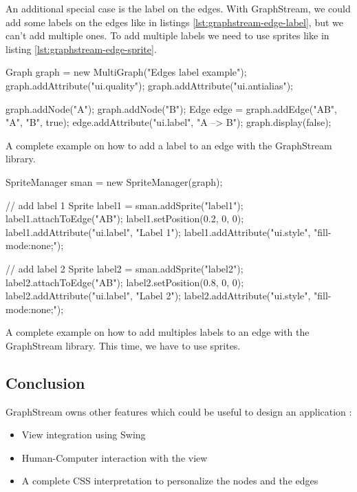 An additional special case is the label on the edges. With GraphStream, we could
add some labels on the edges like in listings \ref{lst:graphstream-edge-label},
but we can't add multiple ones. To add multiple labels we need to use sprites like
in listing \ref{lst:graphstream-edge-sprite}.

\begin{listing}[H]
  \centering
  \begin{javacode}
  Graph graph = new MultiGraph("Edges label example");
  graph.addAttribute("ui.quality");
  graph.addAttribute("ui.antialias");
  
  graph.addNode("A");
  graph.addNode("B");
  Edge edge = graph.addEdge("AB", "A", "B", true);
  edge.addAttribute("ui.label", "A --> B");
  graph.display(false);
  \end{javacode}
  \caption[Adding a label on an edge with GraphStream]{A complete example on how to
add a label to an edge with the GraphStream library.}
  \label{lst:graphstream-edge-label}
\end{listing}

\begin{listing}[H]
  \centering
  \begin{javacode}
    SpriteManager sman = new SpriteManager(graph);

    // add label 1
    Sprite label1 = sman.addSprite("label1");
    label1.attachToEdge("AB");
    label1.setPosition(0.2, 0, 0);
    label1.addAttribute("ui.label", "Label 1");
    label1.addAttribute("ui.style", "fill-mode:none;");

    // add label 2
    Sprite label2 = sman.addSprite("label2");
    label2.attachToEdge("AB");
    label2.setPosition(0.8, 0, 0);
    label2.addAttribute("ui.label", "Label 2");
    label2.addAttribute("ui.style", "fill-mode:none;");
  \end{javacode}
  \caption[Adding two labels on an edge with GraphStream]{A complete example on how
to add multiples labels to an edge with the GraphStream library. This time, we
have to use sprites.}
  \label{lst:graphstream-edge-sprite}
\end{listing}

\subsection{Conclusion}
\label{sub:Conclusion-gs}

GraphStream owns other features which could be useful to design an application :
\begin{itemize}
\item View integration using Swing
\item Human-Computer interaction with the view
\item A complete CSS interpretation to personalize the nodes and the edges
\end{itemize}

